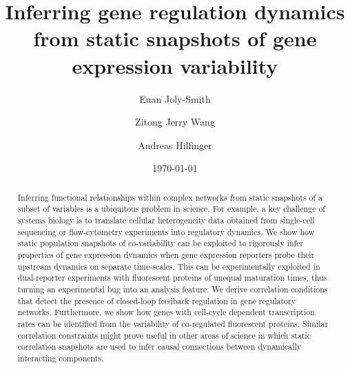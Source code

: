 \documentclass[%
 reprint,prx,
superscriptaddress,
%
%
%
%
%
%
%
%
%
 amsmath,amssymb,
 aps,
%
%
%
%
%
%
]{revtex4-2}
\begin{document}

\title{Inferring gene regulation dynamics from static snapshots of gene expression variability}%
%

\author{Euan Joly-Smith}
%
\author{Zitong Jerry Wang}
\author{Andreas Hilfinger}
%


\date{\today}%

\begin{abstract}
Inferring functional relationships within complex networks from static snapshots of a subset of variables is a ubiquitous problem in science. For example, a key challenge of systems biology is to translate cellular heterogeneity data obtained from single-cell sequencing or flow-cytometry experiments into regulatory dynamics. We show how static population snapshots of co-variability can be exploited to rigorously infer properties of gene expression dynamics when gene expression reporters probe their upstream dynamics on separate time-scales. This can be experimentally exploited in dual-reporter experiments with fluorescent proteins of unequal maturation times, thus turning an experimental bug into an analysis feature. We derive correlation conditions that detect the presence of closed-loop feedback regulation in gene regulatory networks. Furthermore, we show how genes with cell-cycle dependent transcription rates can be identified from the variability of co-regulated fluorescent proteins. %
Similar correlation constraints might prove useful in other areas of science in which static correlation snapshots are used to infer causal connections between dynamically interacting components.
\end{abstract}
%
\maketitle
\end{document}
